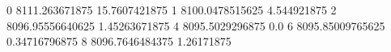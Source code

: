 0 8111.263671875 15.7607421875
1 8100.0478515625 4.544921875
2 8096.95556640625 1.45263671875
4 8095.5029296875 0.0
6 8095.85009765625 0.34716796875
8 8096.7646484375 1.26171875

